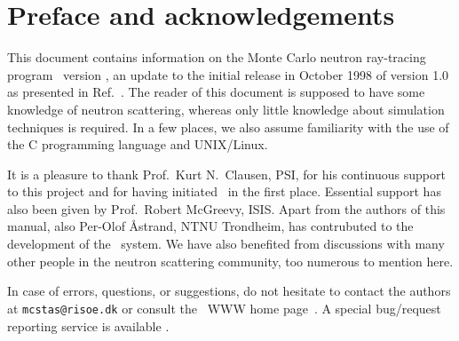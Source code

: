 
\chapter*{Preface and acknowledgements}
This document contains information on the Monte Carlo neutron
ray-tracing program \MCS\ version \version, an update to the initial
release in October 1998 of version 1.0 as presented in Ref.~\cite{nn_10_20}. The reader of this
document is supposed to have some knowledge of neutron scattering,
whereas only little knowledge about simulation techniques is
required. In a few places, we also assume familiarity with the
use of the C programming language and UNIX/Linux.

It is a pleasure to thank Prof.~Kurt N.~Clausen, PSI, for his continuous
support to this project and for having initiated \MCS\ in the first
place. Essential support has also been given by Prof.~Robert McGreevy, ISIS.
Apart from the authors of this manual, also Per-Olof \AA strand, NTNU Trondheim,
has contrubuted to the development of the \MCS\ system.
We have also benefited
from discussions with many other people in the neutron scattering
community, too numerous to mention here.


In case of errors, questions, or suggestions, 
do not hesitate to
contact the authors at \verb+mcstas@risoe.dk+
or consult the \MCS\ WWW home page~\cite{mcstas_webpage}. 
A special bug/request reporting service is available \cite{mczilla_webpage}.

